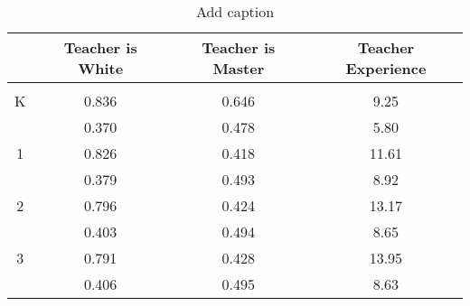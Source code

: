 \documentclass{article}
\begin{document}
\begin{table}[htbp]
  \centering
  \caption{Add caption}
    \begin{tabular}{rccc}
    \toprule
          & Teacher is White & Teacher is Master & Teacher Experience \\
    \midrule
          &       &       &  \\
    \multicolumn{1}{c}{K} & 0.836  & 0.646  & 9.25  \\
          & 0.370  & 0.478  & 5.80  \\
    \multicolumn{1}{c}{1} & 0.826  & 0.418  & 11.61  \\
          & 0.379  & 0.493  & 8.92  \\
    \multicolumn{1}{c}{2} & 0.796  & 0.424  & 13.17  \\
          & 0.403  & 0.494  & 8.65  \\
    \multicolumn{1}{c}{3} & 0.791  & 0.428  & 13.95  \\
          & 0.406  & 0.495  & 8.63  \\
    \bottomrule
    \bottomrule
    \end{tabular}%
  \label{tab:addlabel}%
\end{table}%
\end{document}
